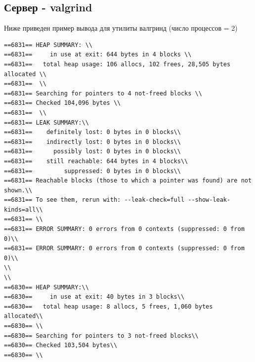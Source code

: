 \documentclass[a4paper,12pt]{report}
\begin{document}
\subsection{Сервер - valgrind}
Ниже приведен пример вывода для утилиты валгринд (число процессов = 2) \\

\begin{verbatim}
==6831== HEAP SUMMARY: \\
==6831==     in use at exit: 644 bytes in 4 blocks \\
==6831==   total heap usage: 106 allocs, 102 frees, 28,505 bytes allocated \\
==6831==  \\
==6831== Searching for pointers to 4 not-freed blocks \\
==6831== Checked 104,096 bytes \\
==6831==  \\
==6831== LEAK SUMMARY:\\
==6831==    definitely lost: 0 bytes in 0 blocks\\
==6831==    indirectly lost: 0 bytes in 0 blocks\\
==6831==      possibly lost: 0 bytes in 0 blocks\\
==6831==    still reachable: 644 bytes in 4 blocks\\
==6831==         suppressed: 0 bytes in 0 blocks\\
==6831== Reachable blocks (those to which a pointer was found) are not shown.\\
==6831== To see them, rerun with: --leak-check=full --show-leak-kinds=all\\
==6831== \\
==6831== ERROR SUMMARY: 0 errors from 0 contexts (suppressed: 0 from 0)\\
==6831== ERROR SUMMARY: 0 errors from 0 contexts (suppressed: 0 from 0)\\
\\
\\
==6830== HEAP SUMMARY:\\
==6830==     in use at exit: 40 bytes in 3 blocks\\
==6830==   total heap usage: 8 allocs, 5 frees, 1,060 bytes allocated\\
==6830== \\
==6830== Searching for pointers to 3 not-freed blocks\\
==6830== Checked 103,504 bytes\\
==6830== \\

\end{verbatim}
\end{document}
